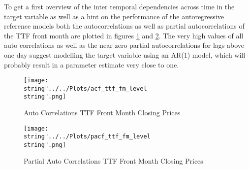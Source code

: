 To get a first overview of the inter temporal dependencies across time in the target variable as well as a hint on the performance of the autoregressive reference models both the autocorrelations  as well as partial autocorrelations of the TTF front month are plotted in figures \ref{fig:acf_ttf_fm_level} and \ref{fig:pacf_ttf_fm_level}. The very high values of all auto correlations as well as the near zero partial autocorrelations for lags above one day suggest modelling the target variable using an AR(1) model, which will probably result in a parameter estimate very close to one. 



\begin{figure}[h!]
  \centering
\texttt{[image: \\string"../../Plots/acf\_ttf\_fm\_level\\string".png]}
  \caption{Auto Correlations TTF Front Month Closing Prices}\label{fig:acf_ttf_fm_level}
\end{figure}

\begin{figure}[h!]
  \centering
\texttt{[image: \\string"../../Plots/pacf\_ttf\_fm\_level\\string".png]}
  \caption{Partial Auto Correlations TTF Front Month Closing Prices}\label{fig:pacf_ttf_fm_level}
\end{figure}

\FloatBarrier
